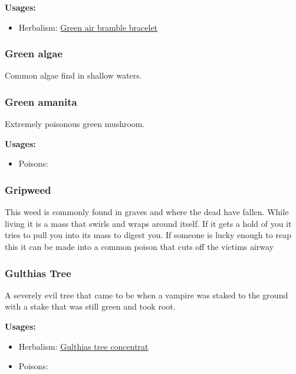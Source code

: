 \textbf{Usages:}

\begin{itemize}[noitemsep]
\item[] Herbalism: \hyperref[Green air bramble bracelet]{Green air bramble bracelet}
\end{itemize}

\subsubsection{Green algae}

Common algae find in shallow waters.

\subsubsection{Green amanita}
\label{Green amanita}

Extremely poisonous green mushroom.

\vspace{5mm}

\textbf{Usages:}

\begin{itemize}[noitemsep]
\item[] Poisons: \poison\poison
\end{itemize}

\subsubsection{Gripweed}
\label{gripweed}

This weed is commonly found in graves and where the dead have fallen. While living it is a mass that swirls and wraps around
itself. If it gets a hold of you it tries to pull you into its mass to digest you. If someone is lucky enough to reap this it
can be made into a common poison that cuts off the victims airway

\subsubsection{Gulthias Tree}
\label{Gulthias Tree}

A severely evil tree that came to be when a vampire was staked to the ground with a stake that was still green and took root.

\vspace{5mm}

\textbf{Usages:}

\begin{itemize}[noitemsep]
\item[] Herbalism: \hyperref[Gulthias tree concentrat]{Gulthias tree concentrat}
\item[] Poisons: \poison\poison
\end{itemize}

